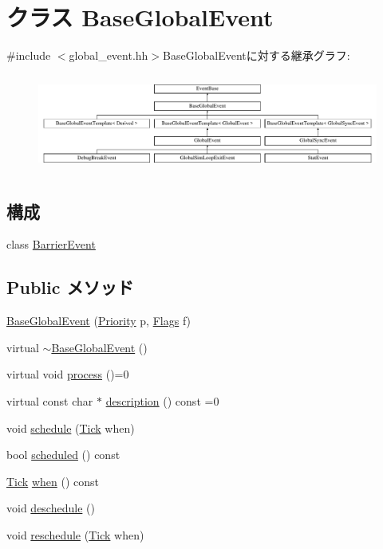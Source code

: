 \hypertarget{classBaseGlobalEvent}{
\section{クラス BaseGlobalEvent}
\label{classBaseGlobalEvent}
}


{\ttfamily \#include $<$global\_\-event.hh$>$}BaseGlobalEventに対する継承グラフ:\begin{figure}[H]
\begin{center}
\leavevmode
\includegraphics[height=3.25203cm]{classBaseGlobalEvent}
\end{center}
\end{figure}
\subsection*{構成}
\begin{DoxyCompactItemize}
\item 
class \hyperlink{classBaseGlobalEvent_1_1BarrierEvent}{BarrierEvent}
\end{DoxyCompactItemize}
\subsection*{Public メソッド}
\begin{DoxyCompactItemize}
\item 
\hyperlink{classBaseGlobalEvent_adb528c92040920c5f2c51468230da763}{BaseGlobalEvent} (\hyperlink{classEventBase_a6d92f7ee8144a5911ed46d85a89a4934}{Priority} p, \hyperlink{classFlags}{Flags} f)
\item 
virtual \hyperlink{classBaseGlobalEvent_aedd3366fd398048fa2ac79e1a5d7b297}{$\sim$BaseGlobalEvent} ()
\item 
virtual void \hyperlink{classBaseGlobalEvent_a142b75b68a6291400e20fb0dd905b1c8}{process} ()=0
\item 
virtual const char $\ast$ \hyperlink{classBaseGlobalEvent_aaf0ee88413e805ebda5569f5c13d847f}{description} () const =0
\item 
void \hyperlink{classBaseGlobalEvent_a5220ca6f213232cef86e6fba80ba9a70}{schedule} (\hyperlink{base_2types_8hh_a5c8ed81b7d238c9083e1037ba6d61643}{Tick} when)
\item 
bool \hyperlink{classBaseGlobalEvent_a9cd69a6b10cb037550943f177a0da688}{scheduled} () const 
\item 
\hyperlink{base_2types_8hh_a5c8ed81b7d238c9083e1037ba6d61643}{Tick} \hyperlink{classBaseGlobalEvent_a1883243a0117678c5695f2435dcabbdc}{when} () const 
\item 
void \hyperlink{classBaseGlobalEvent_a210ef248fbe7c0e13a3497711c2a5e0f}{deschedule} ()
\item 
void \hyperlink{classBaseGlobalEvent_afe2a0f92341ee6efef34e3d8eeea299d}{reschedule} (\hyperlink{base_2types_8hh_a5c8ed81b7d238c9083e1037ba6d61643}{Tick} when)
\end{DoxyCompactItemize}
